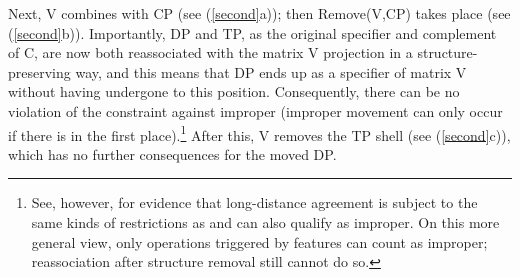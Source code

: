 \documentclass[output=paper]{langsci/langscibook}
\begin{document}
Next, V combines with CP (see (\ref{second}a)); then Remove(V,CP) takes place
(see (\ref{second}b)). Importantly, DP and TP, as the original specifier and
complement of C, are now both reassociated with the matrix V projection in a
structure-preserving way, and this means that DP ends up as a specifier of
matrix V without having undergone  to this position. Consequently,
there can be no violation of the constraint against improper  (improper
movement can only occur if there is  in the first place).\footnote{See,
    however, \cite{Keine:16} for evidence that long-distance
    agreement is
    subject to the same kinds of restrictions as  and can also qualify
    as improper. On this more general view, only operations triggered by
features can count as improper; reassociation after structure removal still
cannot do so.} After this, V removes the TP shell (see (\ref{second}c)), which
has no further consequences for the moved DP.
\end{document}
